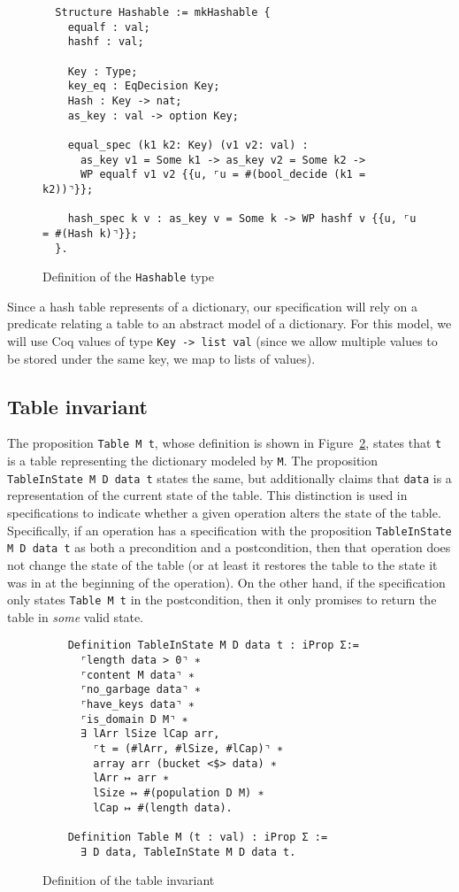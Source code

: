 \documentclass[10pt,a4paper]{article}
\begin{document}
\begin{figure}
\begin{verbatim}
  Structure Hashable := mkHashable {
    equalf : val;
    hashf : val;
                            
    Key : Type;
    key_eq : EqDecision Key;
    Hash : Key -> nat;
    as_key : val -> option Key;

    equal_spec (k1 k2: Key) (v1 v2: val) :
      as_key v1 = Some k1 -> as_key v2 = Some k2 ->
      WP equalf v1 v2 {{u, ⌜u = #(bool_decide (k1 = k2))⌝}};

    hash_spec k v : as_key v = Some k -> WP hashf v {{u, ⌜u = #(Hash k)⌝}};
  }.
\end{verbatim}
\caption{Definition of the \texttt{Hashable} type}
\label{fig:hashable}
\end{figure}

Since a hash table represents of a dictionary, our specification will rely on a predicate relating a table to an abstract model of a dictionary. For this model, we will use Coq values of type \texttt{Key -> list val} (since we allow multiple values to be stored under the same key, we map to lists of values).

\subsection{Table invariant}
The proposition \texttt{Table M t}, whose definition is shown in Figure~\ref{fig:table_inv}, states that \texttt{t} is a table representing the dictionary modeled by \texttt{M}. The proposition \texttt{TableInState M D data t} states the same, but additionally claims that \texttt{data} is a representation of the current state of the table. This distinction is used in specifications to indicate whether a given operation alters the state of the table. Specifically, if an operation has a specification with the proposition \texttt{TableInState M D data t} as both a precondition and a postcondition, then that operation does not change the state of the table (or at least it restores the table to the state it was in at the beginning of the operation). On the other hand, if the specification only states \texttt{Table M t} in the postcondition, then it only promises to return the table in \emph{some} valid state.

\begin{figure}
\begin{verbatim}
    Definition TableInState M D data t : iProp Σ:=
      ⌜length data > 0⌝ ∗
      ⌜content M data⌝ ∗
      ⌜no_garbage data⌝ ∗
      ⌜have_keys data⌝ ∗
      ⌜is_domain D M⌝ ∗
      ∃ lArr lSize lCap arr,
        ⌜t = (#lArr, #lSize, #lCap)⌝ ∗
        array arr (bucket <$> data) ∗
        lArr ↦ arr ∗
        lSize ↦ #(population D M) ∗
        lCap ↦ #(length data).

    Definition Table M (t : val) : iProp Σ :=
      ∃ D data, TableInState M D data t.
\end{verbatim}
\caption{Definition of the table invariant}
\label{fig:table_inv}
\end{figure}
\end{document}
